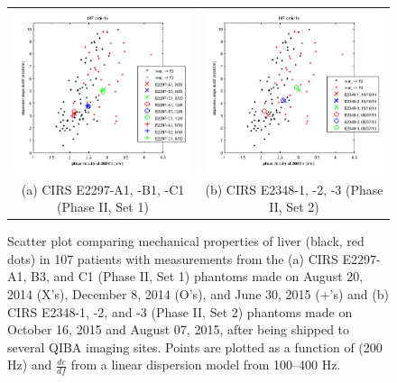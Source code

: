 \begin{figure}[htb!]
    \centering
    \begin{tabular}{cc}
        \includegraphics[width=0.5\linewidth]{figs/phantom_liver_scatter_plot.png} &
        \includegraphics[width=0.5\linewidth]{figs/phaseIIset2scatterplot.png} \\
        (a) CIRS E2297-A1, -B1, -C1 (Phase II, Set 1) &
        (b) CIRS E2348-1, -2, -3 (Phase II, Set 2) \\
    \end{tabular}
    \caption{Scatter plot comparing mechanical properties of liver (black, red
        dots) in 107 patients with measurements from the (a) CIRS E2297-A1,
        B3, and C1 (Phase II, Set 1) phantoms made on August 20, 2014 (X’s),
        December 8, 2014 (O’s), and June 30, 2015 (+’s) and (b) CIRS
        E2348-1, -2, and -3 (Phase II, Set 2) phantoms made on October 16, 2015
        and August 07, 2015, after being shipped to several QIBA imaging sites. 
        Points are plotted as a function of (200 Hz) and $\frac{dc}{df}$ from a
        linear dispersion model from 100--400 Hz.}
\label{fig:phantom_liver_scatter_plot}
\end{figure}
